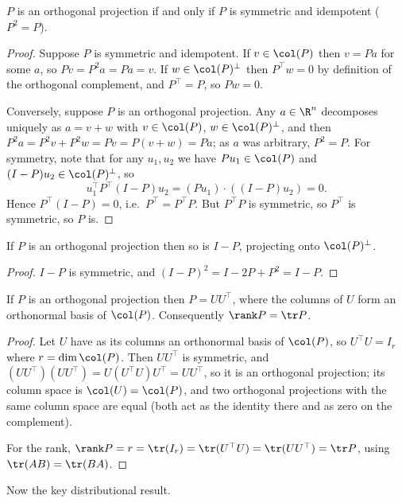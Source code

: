 \begin{proposition}
  $P$ is an orthogonal projection if and only if $P$ is symmetric and idempotent ($P^2 = P$).
\end{proposition}
\begin{proof}
  Suppose $P$ is symmetric and idempotent. If $v \in \col(P)$ then $v = Pa$ for some $a$, so $Pv = P^2a = Pa = v$. If $w \in \col(P)^\perp$ then $P^\top w = 0$ by definition of the orthogonal complement, and $P^\top = P$, so $Pw = 0$.

  Conversely, suppose $P$ is an orthogonal projection. Any $a \in \R^n$ decomposes uniquely as $a = v + w$ with $v \in \col(P)$, $w \in \col(P)^\perp$, and then $P^2a = P^2 v + P^2 w = Pv = P(v+w) = Pa$; as $a$ was arbitrary, $P^2 = P$. For symmetry, note that for any $u_1, u_2$ we have $Pu_1 \in \col(P)$ and $(I-P)u_2 \in \col(P)^\perp$, so
  $$
  u_1^\top P^\top (I-P)u_2 = \left(Pu_1\right)\cdot\left((I-P)u_2\right) = 0.
  $$
  Hence $P^\top(I-P) = 0$, i.e.\ $P^\top = P^\top P$. But $P^\top P$ is symmetric, so $P^\top$ is symmetric, so $P$ is.
\end{proof}

\begin{corollary}
  If $P$ is an orthogonal projection then so is $I - P$, projecting onto $\col(P)^\perp$.
\end{corollary}
\begin{proof}
  $I-P$ is symmetric, and $(I-P)^2 = I - 2P + P^2 = I - P$.
\end{proof}

\begin{proposition}
  If $P$ is an orthogonal projection then $P = UU^\top$, where the columns of $U$ form an orthonormal basis of $\col(P)$. Consequently $\rank P = \tr P$.
\end{proposition}
\begin{proof}
  Let $U$ have as its columns an orthonormal basis of $\col(P)$, so $U^\top U = I_r$ where $r = \dim\col(P)$. Then $UU^\top$ is symmetric, and $(UU^\top)(UU^\top) = U(U^\top U)U^\top = UU^\top$, so it is an orthogonal projection; its column space is $\col(U) = \col(P)$, and two orthogonal projections with the same column space are equal (both act as the identity there and as zero on the complement).

  For the rank, $\rank P = r = \tr(I_r) = \tr(U^\top U) = \tr(UU^\top) = \tr P$, using $\tr(AB) = \tr(BA)$.
\end{proof}

Now the key distributional result.

